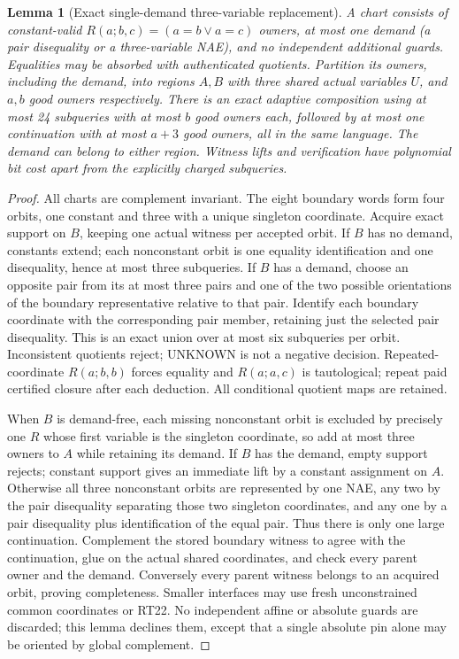 \documentclass[11pt]{article}
\newtheorem{lemma}[theorem]{Lemma}
\begin{document}
\begin{lemma}[Exact single-demand three-variable replacement]\label{lem:dp17-interface}
A chart consists of constant-valid $R(a;b,c)=(a=b\lor a=c)$ owners, at most one demand (a pair disequality or a three-variable NAE), and no independent additional guards. Equalities may be absorbed with authenticated quotients. Partition its owners, including the demand, into regions $A,B$ with three shared actual variables $U$, and $a,b$ good owners respectively. There is an exact adaptive composition using at most 24 subqueries with at most $b$ good owners each, followed by at most one continuation with at most $a+3$ good owners, all in the same language. The demand can belong to either region. Witness lifts and verification have polynomial bit cost apart from the explicitly charged subqueries.
\end{lemma}
\begin{proof}
All charts are complement invariant. The eight boundary words form four orbits, one constant and three with a unique singleton coordinate. Acquire exact support on $B$, keeping one actual witness per accepted orbit. If $B$ has no demand, constants extend; each nonconstant orbit is one equality identification and one disequality, hence at most three subqueries. If $B$ has a demand, choose an opposite pair from its at most three pairs and one of the two possible orientations of the boundary representative relative to that pair. Identify each boundary coordinate with the corresponding pair member, retaining just the selected pair disequality. This is an exact union over at most six subqueries per orbit. Inconsistent quotients reject; UNKNOWN is not a negative decision. Repeated-coordinate $R(a;b,b)$ forces equality and $R(a;a,c)$ is tautological; repeat paid certified closure after each deduction. All conditional quotient maps are retained.

When $B$ is demand-free, each missing nonconstant orbit is excluded by precisely one $R$ whose first variable is the singleton coordinate, so add at most three owners to $A$ while retaining its demand. If $B$ has the demand, empty support rejects; constant support gives an immediate lift by a constant assignment on $A$. Otherwise all three nonconstant orbits are represented by one NAE, any two by the pair disequality separating those two singleton coordinates, and any one by a pair disequality plus identification of the equal pair. Thus there is only one large continuation. Complement the stored boundary witness to agree with the continuation, glue on the actual shared coordinates, and check every parent owner and the demand. Conversely every parent witness belongs to an acquired orbit, proving completeness. Smaller interfaces may use fresh unconstrained common coordinates or RT22. No independent affine or absolute guards are discarded; this lemma declines them, except that a single absolute pin alone may be oriented by global complement.
\end{proof}
\end{document}
